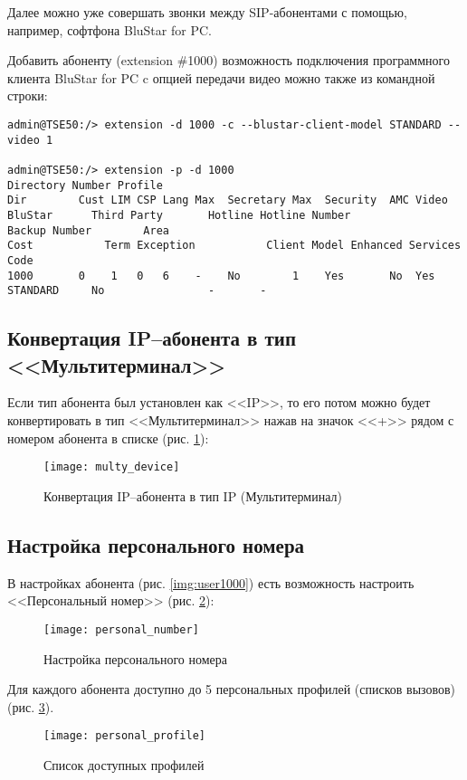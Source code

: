 Далее можно уже совершать звонки между SIP-абонентами с помощью, например, софтфона BluStar for PC.

Добавить абоненту (extension \#1000) возможность подключения программного клиента BluStar for PC c опцией передачи видео можно также из командной строки:
\begin{lstlisting}
admin@TSE50:/> extension -d 1000 -c --blustar-client-model STANDARD --video 1

admin@TSE50:/> extension -p -d 1000
Directory Number Profile
Dir        Cust LIM CSP Lang Max  Secretary Max  Security  AMC Video BluStar      Third Party       Hotline Hotline Number
Backup Number        Area
Cost           Term Exception           Client Model Enhanced Services
Code
1000       0    1   0   6    -    No        1    Yes       No  Yes   STANDARD     No                -       -
\end{lstlisting}

\subsection{Конвертация IP--абонента в тип <<Мультитерминал>>}

Если тип абонента был установлен как <<IP>>, то его потом можно будет конвертировать в тип <<Мультитерминал>> нажав на значок <<+>> рядом с номером абонента в списке (рис. \ref{img:multy_dev}):
\begin{figure}[!ht]
  \center
  \texttt{[image: multy\_device]}
  \caption{Конвертация IP--абонента в тип IP (Мультитерминал)}
  \label{img:multy_dev}
\end{figure}

\subsection{Настройка персонального номера}

В настройках абонента (рис. \ref{img:user1000}) есть возможность настроить <<Персональный номер>> (рис. \ref{img:personal_number}): 

\begin{figure}[!ht]
  \center
  \texttt{[image: personal\_number]}
  \caption{Настройка персонального номера}
  \label{img:personal_number}
\end{figure}

Для каждого абонента доступно до 5 персональных профилей (списков вызовов) (рис. \ref{img:personal_profile}).

\begin{figure}[!ht]
  \center
  \texttt{[image: personal\_profile]}
  \caption{Список доступных профилей}
  \label{img:personal_profile}
\end{figure}

